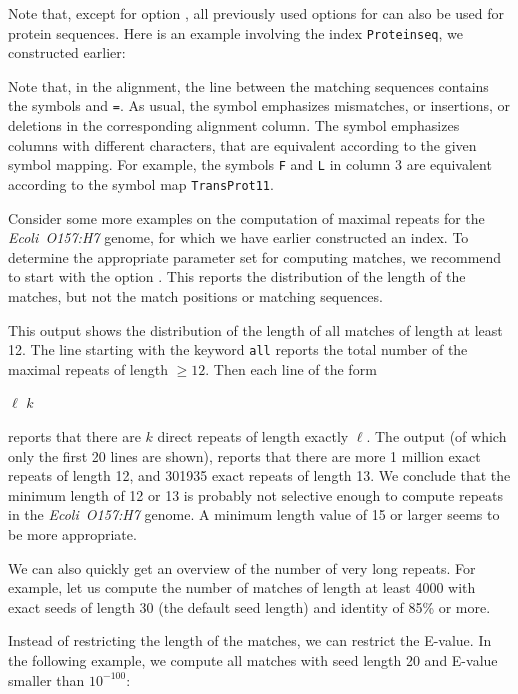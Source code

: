 \documentclass[12pt,titlepage]{article}
\makeatletter
\newcommand{\Seqfilename}[1]{\texttt{\small #1}\index{#1@\texttt{#1}}}
\newcommand{\EcoliH}[0]{\emph{Ecoli~O157:H7}\index{Ecoli~O157:H7}\xspace}
\newcommand{\EXECUTE}[1]{}
\makeatother
\begin{document}
\begin{AboutVmatch}
Note that, except for option , all previously used
options for \VM can also be used for protein sequences. Here is an
example involving the index \Seqfilename{Proteinseq}, we constructed 
earlier:

\EXECUTE{vmatch -s -l 50 -exdrop 2 Proteinseq}

Note that, in the alignment,
the line between the matching sequences contains the symbols
\texttt{} and \texttt{=}. As usual, the symbol \texttt{}
emphasizes mismatches, or insertions, or deletions in the corresponding
alignment column. The symbol \texttt{} emphasizes columns
with different characters, that are equivalent according to the
given symbol mapping. For example, the symbols \texttt{F} and 
\texttt{L} in column 3 are equivalent according to the symbol map
\texttt{TransProt11}.

Consider some more examples on the computation of maximal repeats 
for the \EcoliH genome, for which we have earlier constructed an index.
To determine the appropriate parameter set for computing matches, we 
recommend to start with the option . 
This reports the distribution of the length of the matches, but not the 
match positions or matching sequences.

\EXECUTE{vmatch -i -l 12 EcoliO157H7 | head -n 20}

This output shows the distribution of the length of all matches of length 
at least 12. The line starting with the keyword \texttt{all} reports 
the total number of the maximal repeats of length \(\geq 12\). Then 
each line of the form

\texttt{} $\ell$ $k$

reports that there are $k$ direct repeats of length exactly \(\ell\).
The output (of which only the first 20 lines are shown), reports that
there are more 1 million exact repeats of length 12, and 301935 
exact repeats of length 13. We conclude that the minimum length of
12 or 13 is probably not selective enough to compute repeats in
the \EcoliH genome. A minimum length value of 15 or larger
seems to be more appropriate.

We can also quickly get an overview of the number of very long
repeats. For example, let us compute the number of matches of length
at least 4000 with exact seeds of length 30 (the default seed length)
and identity of 85\% or more.

\EXECUTE{vmatch -i -exdrop 5 -l 4000 -identity 85 EcoliO157H7}

Instead of restricting the length of the matches, we can restrict
the E-value. In the following example, we compute all matches with
seed length 20 and E-value smaller than \(10^{-100}\):


\end{AboutVmatch}
\end{document}
